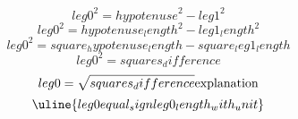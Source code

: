 \[ {leg0}^{2}={hypotenuse}^{2}-{leg1}^{2} \]
\[ {leg0}^{2}={hypotenuse_length}^{2}-{leg1_length}^{2} \]
\[ {leg0}^{2}={square_hypotenuse_length}-{square_leg1_length} \]
\[ {leg0}^{2}={squares_difference} \]
\[ {leg0}=\sqrt{\mathstrut {squares_difference}}\text{{explanation}}\]
\[ \uline{{leg0}{equal_sign}{leg0_length_with_unit}}\]